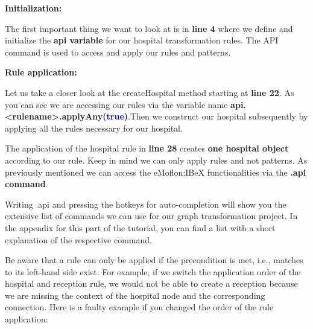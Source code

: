 {{}

\clearpage

\textbf{Initialization:}

The first important thing we want to look at is in \textbf{line 4} where we define and initialize the \textbf{api variable} for our hospital transformation rules.\newline
The API command is used to access and apply our rules and patterns.\newline



\textbf{Rule application:}

Let us take a closer look at the \textsf{createHospital} method starting at \textbf{line 22}.\newline
As you can see we are accessing our rules via the variable name \textbf{api.<rulename>.applyAny(\textcolor{blue}{true})}.\newline Then we construct our hospital subsequently by applying all the rules necessary for our hospital.\newline

The application of the hospital rule in \textbf{line 28} creates \textbf{one hospital object} according to our rule. Keep in mind we can only apply rules and not patterns. As previously mentioned we can access the eMoflon:IBeX functionalities via the \textbf{.api command}.\newline

Writing \textsf{.api} and pressing the hotkeys for auto-completion will show you the extensive list of commands we can use for our graph transformation project. In the appendix for this part of the tutorial, you can find a list with a short explanation of the respective command.\newline

Be aware that a rule can only be applied if the precondition is met, i.e., matches to its left-hand side exist.\newline
For example, if we switch the application order of the hospital and reception rule, we would not be able to create a reception because we are missing the context of the hospital node and the corresponding connection.\newline
Here is a faulty example if you changed the order of the rule application:\newline

}
